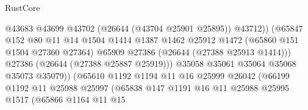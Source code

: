 \begin{lexlean}{RustCore}
\begin{coremodule}
                                              @43683
                                              @43699
                                              @43702
                                              (@26644 (@43704 @25901 @25895))
                                              @43712))
                                          (@65847
                                            @152
                                            @80
                                            @11
                                            @14
                                            @1504
                                            @1414
                                            @1387
                                            @1462
                                            @25912
                                            @1472
                                            (@65860 @151 @1504 @27360 @27364)
                                            @65909
                                            @27386
                                            (@26644 (@27388 @25913 @1414)))
                                          @27386
                                          (@26644 (@27388 @25887 @25919)))
                                        @35058
                                        @35061
                                        @35064
                                        @35068
                                        @35073
                                        @35079))
                                    (@65610
                                      @1192
                                      @1194
                                      @11
                                      @16
                                      @25999
                                      @26042
                                      (@66199
                                        @1192
                                        @11
                                        @25988
                                        @25997
                                        (@65838
                                          @147
                                          @1191
                                          @16
                                          @11
                                          @25988
                                          @25995
                                          @1517
                                          (@65866
                                            @1164
                                            @11
                                            @15

\end{coremodule}
\end{lexlean}
